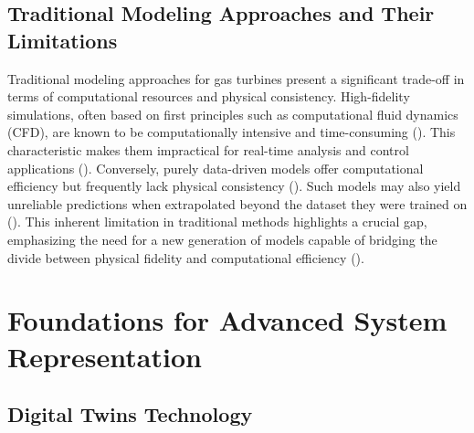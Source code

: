 \documentclass[
  12pt,
  oneside,
  a4paper,
  english,
  brazil]{abntex2}
\begin{document}
\subsection{Traditional Modeling Approaches and Their
Limitations}\label{traditional-modeling-approaches-and-their-limitations}

Traditional modeling approaches for gas turbines present a significant
trade-off in terms of computational resources and physical consistency.
High-fidelity simulations, often based on first principles such as
computational fluid dynamics (CFD), are known to be computationally
intensive and time-consuming
(). This characteristic makes them impractical for real-time
analysis and control applications
(). Conversely, purely data-driven models offer computational
efficiency but frequently lack physical consistency
(). Such models may
also yield unreliable predictions when extrapolated beyond the dataset
they were trained on (). This inherent limitation in traditional methods highlights a
crucial gap, emphasizing the need for a new generation of models capable
of bridging the divide between physical fidelity and computational
efficiency ().

\section{\texorpdfstring{\textbf{Foundations for Advanced System Representation}}{}}\label{section-3}

\subsection{Digital Twins Technology}\label{digital-twins-technology}
\end{document}
